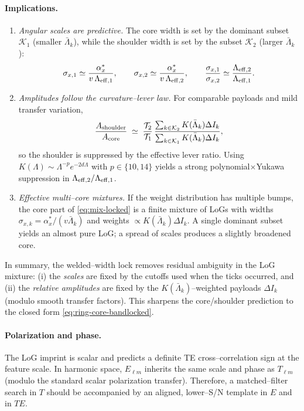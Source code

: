 \documentclass[10pt]{article}
\theoremstyle{definition}
\theoremstyle{plain}
\begin{document}
\paragraph{Implications.}\label{par:uom-main-165}
\begin{enumerate}
\item \emph{Angular scales are predictive.} The core width is set by the dominant subset $\mathcal K_1$
(smaller $\bar\Lambda_k$), while the shoulder width is set by the subset $\mathcal K_2$ (larger $\bar\Lambda_k$):
\[
\sigma_{x,1}\simeq \frac{\alpha_x^{*}}{v\,\Lambda_{\rm eff,1}},\qquad
\sigma_{x,2}\simeq \frac{\alpha_x^{*}}{v\,\Lambda_{\rm eff,2}},\qquad
\frac{\sigma_{x,1}}{\sigma_{x,2}}\simeq \frac{\Lambda_{\rm eff,2}}{\Lambda_{\rm eff,1}}.
\]
\item \emph{Amplitudes follow the curvature–lever law.}
For comparable payloads and mild transfer variation,
\[
\frac{A_{\rm shoulder}}{A_{\rm core}}
\;\simeq\;\frac{\mathcal T_2}{\mathcal T_1}\,
\frac{\sum_{k\in\mathcal K_2}K(\bar\Lambda_k)\Delta I_k}{\sum_{k\in\mathcal K_1}K(\bar\Lambda_k)\Delta I_k},
\]
so the shoulder is suppressed by the effective lever ratio. Using \(K(\Lambda)\sim \Lambda^{-p}e^{-2d\Lambda}\) with
\(p\in\{10,14\}\) yields a strong polynomial\(\times\)Yukawa suppression in \(\Lambda_{\rm eff,2}/\Lambda_{\rm eff,1}\).
\item \emph{Effective multi–core mixtures.} If the weight distribution has multiple bumps, the core part of
\eqref{eq:mix-locked} is a finite mixture of LoGs with widths \(\sigma_{x,k}=\alpha_x^{*}/(v\bar\Lambda_k)\) and
weights \(\propto K(\bar\Lambda_k)\Delta I_k\). A single dominant subset yields an almost pure LoG; a spread of
scales produces a slightly broadened core.
\end{enumerate}
In summary, the welded–width lock removes residual ambiguity in the LoG mixture: (i) the \emph{scales} are fixed by the
cutoffs used when the ticks occurred, and (ii) the \emph{relative amplitudes} are fixed by the
\(K(\bar\Lambda_k)\)–weighted payloads \(\Delta I_k\) (modulo smooth transfer factors). This sharpens the core/shoulder
prediction to the closed form \eqref{eq:ring-core-bandlocked}.


\paragraph{Polarization and phase.}\label{par:uom-main-166}
The LoG imprint is scalar and predicts a definite TE cross–correlation sign at the feature scale.
In harmonic space, \(E_{\ell m}\) inherits the same scale and phase as \(T_{\ell m}\) (modulo the standard
scalar polarization transfer). Therefore, a matched–filter search in \(T\) should be accompanied by an
aligned, lower–S/N template in \(E\) and in \(TE\).
\end{document}
